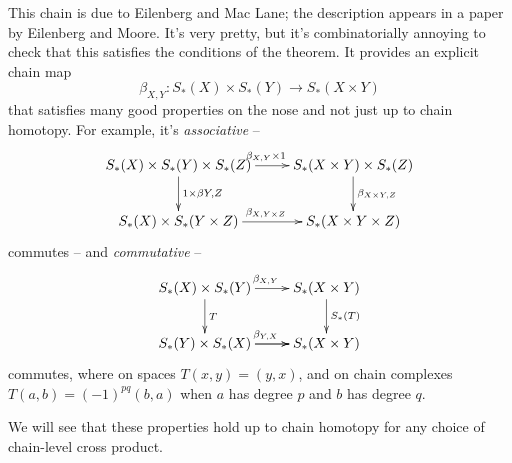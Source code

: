 This chain is due to Eilenberg and Mac Lane; the description appears 
in a paper \cite{eilenberg-moore} by Eilenberg and Moore. 
It's very pretty, but it's combinatorially annoying to check that this satisfies the conditions of the theorem. It provides an explicit chain map
\[
\beta_{X,Y}:S_*(X)\times S_*(Y)\to S_*(X\times Y)
\]
that satisfies many good properties on the nose and not just up to chain homotopy. For example, it's {\em associative} --
\[
\xymatrix{
S_*(X)\times S_*(Y)\times S_*(Z) \ar[r]^{\beta_{X,Y}\times 1} 
\ar[d]^{1\times\beta{Y,Z}} & 
S_*(X\times Y)\times S_*(Z) \ar[d]^{\beta_{X\times Y,Z}} \\
S_*(X)\times S_*(Y\times Z) \ar[r]^{\beta_{X,Y\times Z}} &
S_*(X\times Y\times Z)
}\]
commutes -- and {\em commutative} --
\[
\xymatrix{
S_*(X)\times S_*(Y) \ar[r]^{\beta_{X,Y}} \ar[d]^{T} & 
S_*(X\times Y) \ar[d]^{S_*(T)} \\
S_*(Y)\times S_*(X) \ar[r]^{\beta_{Y,X}} \ar[r] & S_*(X\times Y)
}\]
commutes, where on spaces $T(x,y)=(y,x)$, and on chain complexes
$T(a,b)=(-1)^{pq}(b,a)$ when $a$ has degree $p$ and $b$ has degree $q$. 

We will see that these properties hold up to chain homotopy for any 
choice of chain-level cross product.

